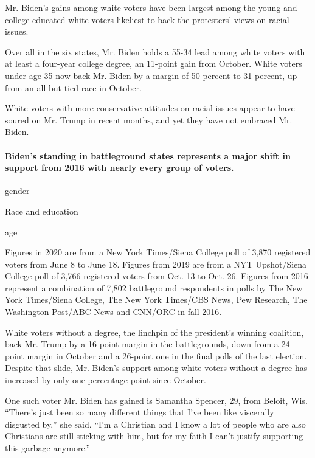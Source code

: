Mr. Biden's gains among white voters have been largest among the young
and college-educated white voters likeliest to back the protesters'
views on racial issues.

Over all in the six states, Mr. Biden holds a 55-34 lead among white
voters with at least a four-year college degree, an 11-point gain from
October. White voters under age 35 now back Mr. Biden by a margin of 50
percent to 31 percent, up from an all-but-tied race in October.

White voters with more conservative attitudes on racial issues appear to
have soured on Mr. Trump in recent months, and yet they have not
embraced Mr. Biden.

\hypertarget{bidens-standing-in-battleground-states-represents-a-major-shift-in-support-from-2016-with-nearly-every-group-of-voters}{%
\paragraph{Biden's standing in battleground states represents a major
shift in support from 2016 with nearly every group of
voters.}\label{bidens-standing-in-battleground-states-represents-a-major-shift-in-support-from-2016-with-nearly-every-group-of-voters}}

gender

Race and education

age

Figures in 2020 are from a New York Times/Siena College poll of 3,870
registered voters from June 8 to June 18. Figures from 2019 are from a
NYT Upshot/Siena College
\href{https://www.nytimes3xbfgragh.onion/2019/11/04/upshot/trump-biden-warren-polls.html}{poll}
of 3,766 registered voters from Oct. 13 to Oct. 26. Figures from 2016
represent a combination of 7,802 battleground respondents in polls by
The New York Times/Siena College, The New York Times/CBS News, Pew
Research, The Washington Post/ABC News and CNN/ORC in fall 2016.

White voters without a degree, the linchpin of the president's winning
coalition, back Mr. Trump by a 16-point margin in the battlegrounds,
down from a 24-point margin in October and a 26-point one in the final
polls of the last election. Despite that slide, Mr. Biden's support
among white voters without a degree has increased by only one percentage
point since October.

One such voter Mr. Biden has gained is Samantha Spencer, 29, from
Beloit, Wis. ``There's just been so many different things that I've been
like viscerally disgusted by,'' she said. ``I'm a Christian and I know a
lot of people who are also Christians are still sticking with him, but
for my faith I can't justify supporting this garbage anymore.''

